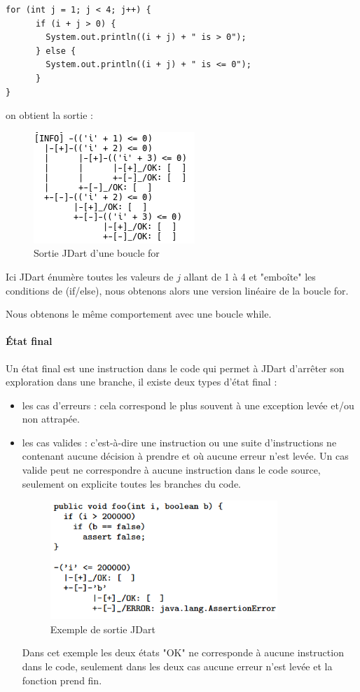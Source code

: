 \begin{verbatim}
for (int j = 1; j < 4; j++) {
      if (i + j > 0) {
      	System.out.println((i + j) + " is > 0");
      } else {
      	System.out.println((i + j) + " is <= 0");
      }
}
\end{verbatim}
on obtient la sortie :
\begin{figure}[H]
 \centering
 \includegraphics[]{./images/jdart_loops.png}
 \caption{Sortie JDart d'une boucle for}
\end{figure}

Ici JDart énumère toutes les valeurs de $j$ allant de 1 à 4 et "embo\^ite" les 
conditions de (if/else), nous obtenons alors une version linéaire de la boucle 
for.

Nous obtenons le même comportement avec une boucle while.

\paragraph{État final}
Un état final est une instruction dans le code qui permet à JDart d'arrêter son 
exploration dans une branche, il existe deux types d'état final : 
\begin{itemize}
 \item les cas d'erreurs : cela correspond le plus souvent à une exception 
levée et/ou non attrapée.
 \item les cas valides : c'est-à-dire une instruction ou une suite 
d'instructions ne contenant aucune décision à prendre et où aucune erreur n'est 
levée. Un cas valide peut ne correspondre à aucune instruction dans le code 
source, seulement on explicite toutes les branches du code.

\begin{figure}[H]
	\centering	
	\includegraphics[scale=0.5]{images/jdart_exemple.png}
	\caption{\label{fig:jdart_sample} Exemple de sortie JDart}
	\label{fig:exemple_out_jdart}
\end{figure}

Dans cet exemple les deux états "OK" ne corresponde à aucune instruction dans 
le code, seulement dans les deux cas aucune erreur n'est levée et la fonction 
prend fin.

\end{itemize}

